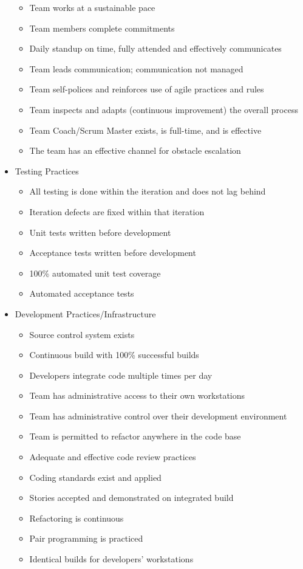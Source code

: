 \begin{appendices}
\begin{itemize}
\begin{itemize}
			\item Team works at a sustainable pace
			\item Team members complete commitments
			\item Daily standup on time, fully attended and effectively communicates
			\item Team leads communication; communication not managed
			\item Team self-polices and reinforces use of agile practices and rules
			\item Team inspects and adapts (continuous improvement) the overall process
			\item Team Coach/Scrum Master exists, is full-time, and is effective
			\item The team has an effective channel for obstacle escalation
		\end{itemize}
	\item Testing Practices
		\begin{itemize}
			\item All testing is done within the iteration and does not lag behind
			\item Iteration defects are fixed within that iteration
			\item Unit tests written before development
			\item Acceptance tests written before development
			\item 100\% automated unit test coverage
			\item Automated acceptance tests
		\end{itemize}
	\item Development Practices/Infrastructure
		\begin{itemize}
			\item Source control system exists
			\item Continuous build with 100\% successful builds
			\item Developers integrate code multiple times per day
			\item Team has administrative access to their own workstations
			\item Team has administrative control over their development environment
			\item Team is permitted to refactor anywhere in the code base
			\item Adequate and effective code review practices
			\item Coding standards exist and applied
			\item Stories accepted and demonstrated on integrated build
			\item Refactoring is continuous
			\item Pair programming is practiced
			\item Identical builds for developers' workstations
		\end{itemize}
\end{itemize}






\end{appendices}
